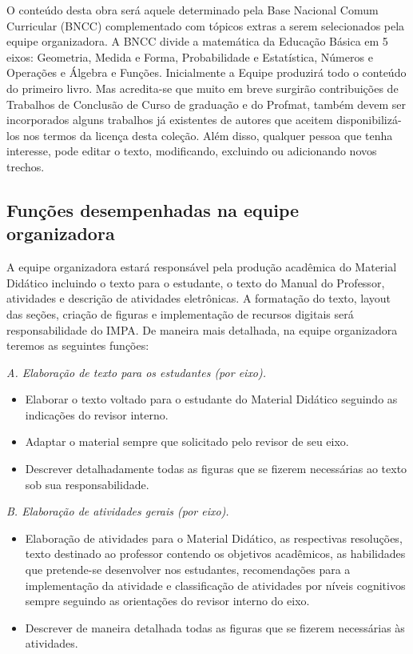 \documentclass[10 pt]{article}
\begin{document}
O conteúdo desta obra será aquele determinado pela Base Nacional Comum Curricular (BNCC) complementado com tópicos extras a serem selecionados pela equipe organizadora.
A BNCC divide a matemática da Educação Básica em 5 eixos: Geometria, Medida e Forma, Probabilidade e Estatística, Números e Operações e Álgebra e Funções.
Inicialmente a Equipe produzirá todo o conteúdo do primeiro livro.
Mas acredita-se que muito em breve surgirão contribuições de Trabalhos de Conclusão de Curso de graduação e do Profmat, também devem ser incorporados alguns trabalhos já existentes de autores que aceitem disponibilizá-los nos termos da licença desta coleção.
Além disso, qualquer pessoa que tenha interesse, pode editar o texto, modificando, excluindo ou adicionando novos trechos.

\subsection{Funções desempenhadas na equipe organizadora}

A equipe organizadora estará responsável pela produção acadêmica do Material Didático incluindo o texto para o estudante, o texto do Manual do Professor, atividades e descrição de atividades eletrônicas. A formatação do texto, layout das seções, criação de figuras e implementação de recursos digitais será responsabilidade do IMPA. De maneira mais detalhada, na equipe organizadora teremos as seguintes funções:
\vspace{0.2cm}

{\it A. Elaboração de texto para os estudantes (por eixo).}
\begin{itemize} %
  \item     Elaborar o texto voltado para o estudante do Material Didático seguindo as indicações do revisor interno.
  \item     Adaptar o material sempre que solicitado pelo revisor de seu eixo.
  \item     Descrever detalhadamente todas as figuras que se fizerem necessárias ao texto sob sua responsabilidade.
\end{itemize} %
\vspace{0.2cm}

{\it B. Elaboração de atividades gerais (por eixo).}
\begin{itemize} %
  \item     Elaboração de atividades para o Material Didático, as respectivas resoluções, texto destinado ao professor contendo os objetivos acadêmicos, as habilidades que pretende-se desenvolver nos estudantes, recomendações para a implementação da atividade e classificação de atividades por níveis cognitivos sempre seguindo as orientações do revisor interno do eixo.
  \item     Descrever de maneira detalhada todas as figuras que se fizerem necessárias às atividades.
\end{itemize} %
\vspace{0.2cm}
\end{document}
